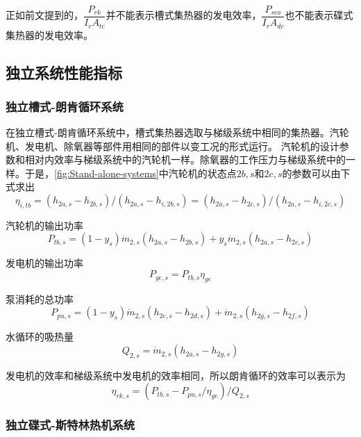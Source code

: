 正如前文提到的，$\dfrac{P_{rk}}{I_rA_{tc}}$并不能表示槽式集热器的发电效率，$\dfrac{P_{sea}}{I_rA_{dc}}$也不能表示碟式集热器的发电效率。

\subsection{独立系统性能指标}

\subsubsection{独立槽式-朗肯循环系统}

在独立槽式-朗肯循环系统中，槽式集热器选取与梯级系统中相同的集热器。汽轮机、发电机、除氧器等部件用相同的部件以变工况的形式运行。
汽轮机的设计参数和相对内效率与梯级系统中的汽轮机一样。除氧器的工作压力与梯级系统中的一样。于是，\autoref{fig:Stand-alone-systems}中汽轮机的状态点$2b,s$和$2c,s$的参数可以由下式求出
\begin{equation}
	\eta_{i,tb}= (h_{2a,s}-h_{2b,s})/(h_{2a,s}-h_{i,2b,s}) = (h_{2a,s}-h_{2c,s})/(h_{2a,s}-h_{i,2c,s})
\end{equation}

汽轮机的输出功率
\begin{equation}
	P_{tb,s}=\left(1-y_{s}\right)\dot{m}_{2,s}\left(h_{2a,s}-h_{2b,s}\right)+y_{s}\dot{m}_{2,s}\left(h_{2a,s}-h_{2c,s}\right)
\end{equation}

发电机的输出功率
\begin{equation}
	P_{ge,s}=P_{tb,s}\eta_{ge}
\end{equation}

泵消耗的总功率
\begin{equation}
	P_{pu,s}=\left(1-y_{s}\right)\dot{m}_{2,s}\left(h_{2e,s}-h_{2d,s}\right)+\dot{m}_{2,s}\left(h_{2g,s}-h_{2f,s}\right)
\end{equation}

水循环的吸热量
\begin{equation}
	Q_{2,s}=\dot{m}_{2,s}\left(h_{2a,s}-h_{2g,s}\right)
\end{equation}

发电机的效率和梯级系统中发电机的效率相同，所以朗肯循环的效率可以表示为
\begin{equation}
	\eta_{rk,s}=(P_{tb,s}-P_{pu,s}/\eta_{ge})/Q_{2,s}
\end{equation}

\subsubsection{独立碟式-斯特林热机系统}

